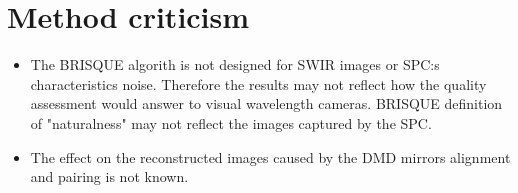 \section{Method criticism}
\begin{itemize}
    \item The BRISQUE algorith is not designed for SWIR images or SPC:s characteristics noise. Therefore the results may not reflect how the quality assessment would answer to visual wavelength cameras. BRISQUE definition of "naturalness" may not reflect the images captured by the SPC. 
    \item The effect on the reconstructed images caused by the DMD mirrors alignment and pairing is not known.
\end{itemize}

